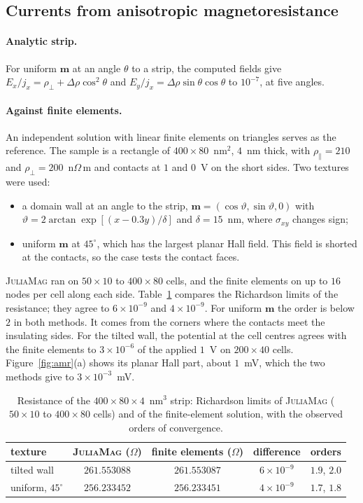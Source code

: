 \documentclass{article}      %
\newcommand{\JuliaMag}{\textsc{JuliaMag}}
\newcommand{\vm}{\bm{m}}
\begin{document}
\subsection{Currents from anisotropic magnetoresistance}
\label{sec:valamr}

\paragraph{Analytic strip.}
For uniform $\vm$ at an angle $\theta$ to a strip, the computed fields give
$E_x/j_x = \rho_\perp + \Delta\rho\cos^2\theta$ and
$E_y/j_x = \Delta\rho\sin\theta\cos\theta$ to $10^{-7}$, at five angles.

\paragraph{Against finite elements.}
An independent solution with linear finite elements on triangles serves as the
reference. The sample is a rectangle of $400\times80$~nm$^2$, $4$~nm thick, with
$\rho_\parallel=210$ and $\rho_\perp=200$~n$\Omega$\,m and contacts at $1$ and
$0$~V on the short sides. Two textures were used:
%
\begin{itemize}
  \item a domain wall at an angle to the strip, $\vm=(\cos\vartheta,\sin\vartheta,0)$
        with $\vartheta = 2\arctan\exp[(x-0.3y)/\delta]$ and $\delta=15$~nm, where
        $\sigma_{xy}$ changes sign;
  \item uniform $\vm$ at $45^\circ$, which has the largest planar Hall field. This
        field is shorted at the contacts, so the case tests the contact faces.
\end{itemize}
%
\JuliaMag{} ran on $50\times10$ to $400\times80$ cells, and the finite elements on
up to $16$ nodes per cell along each side. Table~\ref{tab:amr} compares the
Richardson limits of the resistance; they agree to $6\times10^{-9}$ and
$4\times10^{-9}$. For uniform $\vm$ the order is below $2$ in both methods. It
comes from the corners where the contacts meet the insulating sides. For the tilted
wall, the potential at the cell centres agrees with the finite elements to
$3\times10^{-6}$ of the applied $1$~V on $200\times40$ cells.
Figure~\ref{fig:amr}(a) shows its planar Hall part, about $1$~mV, which the two
methods give to $3\times10^{-3}$~mV.

\begin{table}[t]
  \centering
  \caption{Resistance of the $400\times80\times4$~nm$^3$ strip: Richardson limits
  of \JuliaMag{} ($50\times10$ to $400\times80$ cells) and of the finite-element
  solution, with the observed orders of convergence.}
  \label{tab:amr}
  \begin{tabular}{lcccc}
    \hline
    texture & \JuliaMag{} ($\Omega$) & finite elements ($\Omega$) & difference & orders \\
    \hline
    tilted wall         & $261.553088$ & $261.553087$ & $6\times10^{-9}$ & $1.9$, $2.0$ \\
    uniform, $45^\circ$ & $256.233452$ & $256.233451$ & $4\times10^{-9}$ & $1.7$, $1.8$ \\
    \hline
  \end{tabular}
\end{table}
\end{document}
